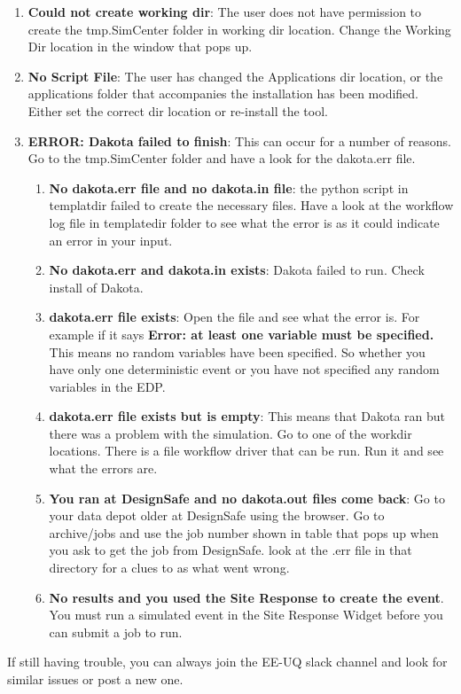 \begin{enumerate}
\item \textbf{Could not create working dir}: The user does not have permission to create the tmp.SimCenter folder in working dir location. Change the Working Dir location in the window that pops up.
\item \textbf{No Script File}: The user has changed the Applications dir location, or the applications folder that accompanies the installation has been modified. Either set the correct dir location or re-install the tool.
\item \textbf{ERROR: Dakota failed to finish}: This can occur for a number of reasons. Go to the tmp.SimCenter folder and have a look for the dakota.err file.
\begin{enumerate}
\item \textbf{No dakota.err file and no dakota.in file}: the python script in templatdir failed to create the necessary files. Have a look at the workflow log file in templatedir folder to see what the error is as it could indicate an error in your input.
\item \textbf{No dakota.err and dakota.in exists}: Dakota failed to run. Check install of Dakota.
\item \textbf{dakota.err file exists}: Open the file and see what the error is.  For example if it says \textbf{Error: at least one variable must be specified.} This means no random variables have been specified. So whether you have only one  deterministic event or you have not specified any random variables in the EDP.
\item \textbf{dakota.err file exists but is empty}: This means that Dakota ran but there was a problem with the simulation. Go to one of the workdir locations. There is a file workflow driver that can be run. Run it and see what the errors are.
\item \textbf{You ran at DesignSafe and no dakota.out files come back}: Go to your data depot older at DesignSafe using the browser. Go to archive/jobs and use the job number shown in table that pops up when you ask to get the job from DesignSafe. look at the .err file in that directory for a clues to as what went wrong.
\item \textbf{No results and you used the Site Response to create the event}. You must run a simulated event in the Site Response Widget before you can submit a job to run.
\end{enumerate}
\end{enumerate}

If still having trouble, you can always join the EE-UQ slack channel and look for similar issues or post a new one.

